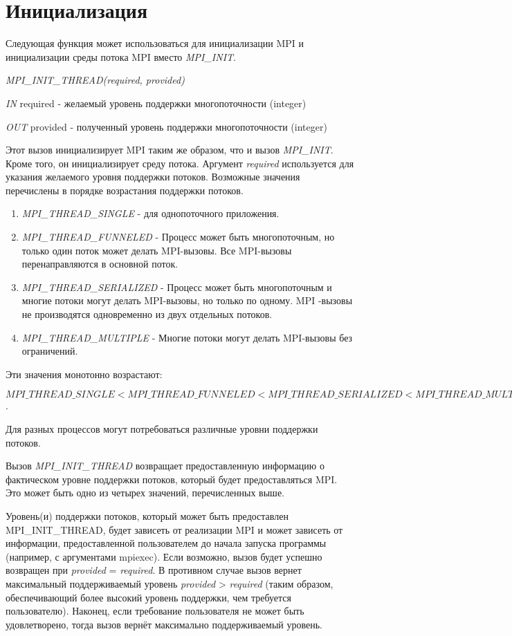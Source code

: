 	\section{Инициализация}
	Следующая функция может использоваться для инициализации MPI и инициализации среды потока MPI вместо \textit{MPI\_INIT}.
	
	\textit{MPI\_INIT\_THREAD(required, provided)}
	
	\textit{IN} required - желаемый уровень поддержки многопоточности (integer)
	
	\textit{OUT} provided - полученный уровень поддержки многопоточности (integer)
	
	Этот вызов инициализирует MPI таким же образом, что и вызов \textit{MPI\_INIT}. Кроме того, он инициализирует среду потока. Аргумент \textit{required} используется для указания желаемого уровня поддержки потоков. Возможные значения перечислены в порядке возрастания поддержки потоков.
	
	\begin{enumerate}
		\item \textit{MPI\_THREAD\_SINGLE} - для однопоточного приложения.
		\item \textit{MPI\_THREAD\_FUNNELED} - Процесс может быть многопоточным, но только один поток может делать MPI-вызовы. Все MPI-вызовы перенаправляются в основной поток.
		\item \textit{MPI\_THREAD\_SERIALIZED} - Процесс может быть многопоточным и многие потоки могут делать MPI-вызовы, но только по одному.
		MPI -вызовы не производятся одновременно из двух отдельных потоков.
		\item \textit{MPI\_THREAD\_MULTIPLE} - Многие потоки могут делать MPI-вызовы без ограничений.
	\end{enumerate}

	Эти значения монотонно возрастают:
	
	$ MPI\_THREAD\_SINGLE < MPI\_THREAD\_FUNNELED < MPI\_THREAD\_SERIALIZED < MPI\_THREAD\_MULTIPLE $.
	 
	Для разных процессов могут потребоваться различные уровни поддержки потоков.
	
	Вызов \textit{MPI\_INIT\_THREAD} возвращает предоставленную информацию о фактическом уровне поддержки потоков, который будет предоставляться MPI. 
	Это может быть одно из четырех значений, перечисленных выше.
	
	Уровень(и) поддержки потоков, который может быть предоставлен MPI\_INIT\_THREAD, будет зависеть от реализации MPI и может зависеть от информации, предоставленной пользователем до начала запуска программы (например, с аргументами mpiexec). 
	Если возможно, вызов будет успешно возвращен при \textit{provided} = \textit{required}. 
	В противном случае вызов вернет максимальный поддерживаемый уровень \textit{provided} > \textit{required} (таким образом, обеспечивающий более высокий уровень поддержки, чем требуется пользователю).
	Наконец, если требование пользователя не может быть удовлетворено, тогда вызов вернёт максимально поддерживаемый уровень.
	
